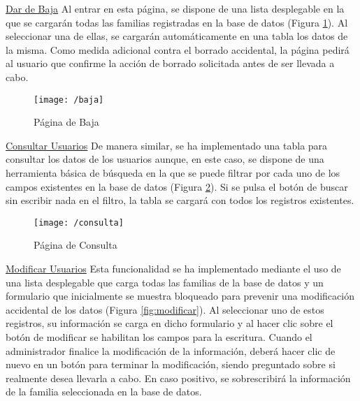 \noindent \underline{Dar de Baja} \newline
Al entrar en esta página, se dispone de una lista desplegable en la que se cargarán todas las familias registradas en la base de datos (Figura \ref{fig:baja}). Al seleccionar una de ellas, se cargarán automáticamente en una tabla los datos de la misma. Como medida adicional contra el borrado accidental, la página pedirá al usuario que confirme la acción de borrado solicitada antes de ser llevada a cabo.

\begin{figure}[!h]
	\begin{center}
		\texttt{[image: /baja]}
		\caption{Página de Baja}
		\label{fig:baja}
	\end{center}
\end{figure}

\clearpage

\noindent \underline{Consultar Usuarios} \newline
De manera similar, se ha implementado una tabla para consultar los datos de los usuarios aunque, en este caso, se dispone de una herramienta básica de búsqueda en la que se puede filtrar por cada uno de los campos existentes en la base de datos (Figura \ref{fig:consulta}). Si se pulsa el botón de buscar sin escribir nada en el filtro, la tabla se cargará con todos los registros existentes.

\begin{figure}[!h]
	\begin{center}
		\texttt{[image: /consulta]}
		\caption{Página de Consulta}
		\label{fig:consulta}
	\end{center}
\end{figure}

\noindent \underline{Modificar Usuarios} \newline
Esta funcionalidad se ha implementado mediante el uso de una lista desplegable que carga todas las familias de la base de datos y un formulario que inicialmente se muestra bloqueado para prevenir una modificación accidental de los datos (Figura \ref{fig:modificar}). Al seleccionar uno de estos registros, su información se carga en dicho formulario y al hacer clic sobre el botón de modificar se habilitan los campos para la escritura. Cuando el administrador finalice la modificación de la información, deberá hacer clic de nuevo en un botón para terminar la modificación, siendo preguntado sobre si realmente desea llevarla a cabo. En caso positivo, se sobrescribirá la información de la familia seleccionada en la base de datos.

